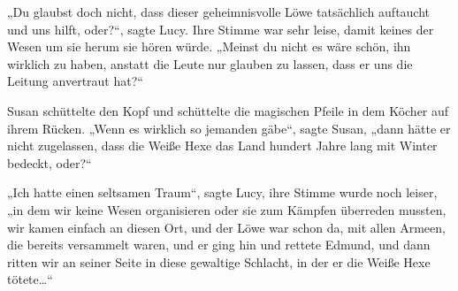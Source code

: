 „Du glaubst doch nicht, dass dieser geheimnisvolle Löwe tatsächlich auftaucht und uns hilft, oder?“, sagte Lucy. Ihre Stimme war sehr leise, damit keines der Wesen um sie herum sie hören würde.
„Meinst du nicht es wäre schön, ihn wirklich zu haben, anstatt die Leute nur glauben zu lassen, dass er uns die Leitung anvertraut hat?“

Susan schüttelte den Kopf und schüttelte die magischen Pfeile in dem Köcher auf ihrem Rücken.
„Wenn es wirklich so jemanden gäbe“, sagte Susan, „dann hätte er nicht zugelassen, dass die Weiße Hexe das Land hundert Jahre lang mit Winter bedeckt, oder?“

„Ich hatte einen seltsamen Traum“, sagte Lucy, ihre Stimme wurde noch leiser, „in dem wir keine Wesen organisieren oder sie zum Kämpfen überreden mussten, wir kamen einfach an diesen Ort, und der Löwe war schon da, mit allen Armeen, die bereits versammelt waren, und er ging hin und rettete Edmund, und dann ritten wir an seiner Seite in diese gewaltige Schlacht, in der er die Weiße Hexe tötete…“

